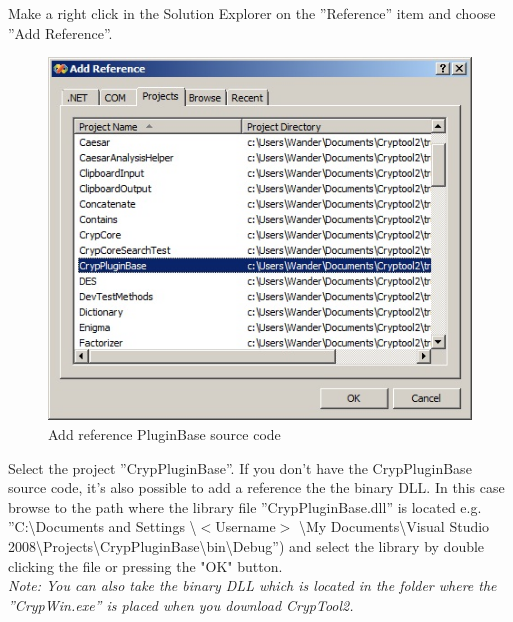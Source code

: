 Make a right click in the Solution Explorer on the ''Reference'' item and choose ''Add Reference''.\\

\begin{figure}[h!]
	\centering
		\includegraphics{figures/add_pluginbase_source.jpg}
	\caption{Add reference PluginBase source code}
	\label{fig:add_pluginbase_source}
\end{figure}

Select the project ''CrypPluginBase''. If you don't have the CrypPluginBase source code, it's also possible to add a reference the the binary DLL. In this case browse to the path where the library file ''CrypPluginBase.dll'' is located e.g. ''C:\textbackslash Documents and Settings \textbackslash $<$Username$>$ \textbackslash My Documents\textbackslash Visual Studio  2008\textbackslash Projects\textbackslash CrypPluginBase\textbackslash bin\textbackslash Debug'') and select the library by double clicking the file or pressing the "OK" button.\\

\textit{\small Note: You can also take the binary DLL which is located in the folder where the ''CrypWin.exe'' is placed when you download CrypTool2.}

